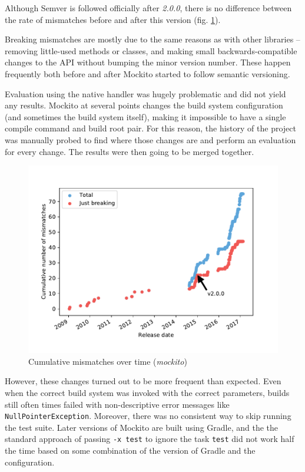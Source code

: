 \documentclass{l4proj}
\newcommand\genericstyle{\lstset{basicstyle=\ttm}}
\newcommand\codeinline[1]{{\genericstyle\lstinline!#1!}}
\begin{document}
Although Semver is followed officially after \textit{2.0.0}, there is
no difference between the rate of mismatches before and after this
version (fig. \ref{MockitoCumulativeMismatches}).

Breaking mismatches are mostly due to the same reasons as with other
libraries -- removing little-used methods or classes, and making small
backwards-compatible changes to the API without bumping the minor
version number. These happen frequently both before and after Mockito
started to follow semantic versioning.


Evaluation using the native handler was hugely problematic and did not
yield any results. Mockito at several points changes the build system
configuration (and sometimes the build system itself), making it
impossible to have a single compile command and build root pair. For
this reason, the history of the project was manually probed to find
where those changes are and perform an evaluation for every change.
The results were then going to be merged together.

\begin{figure}[H]
\centering
\includegraphics[height=0.4\textheight]
{images/evaluation/mockito_cumulative_mismatches}
\caption{Cumulative mismatches over time (\textit{mockito})}
\label{MockitoCumulativeMismatches}
\end{figure}

However, these changes turned out to be more frequent than expected.
Even when the correct build system was invoked with the correct
parameters, builds still often times failed with non-descriptive error
messages like \codeinline{NullPointerException}. Moreover, there was
no consistent way to skip running the test suite. Later versions of
Mockito are built using Gradle, and the the standard
approach of passing \codeinline{-x test} to ignore the task
\codeinline{test} did not work half the time based on some combination
of the version of Gradle and the configuration.
\end{document}

